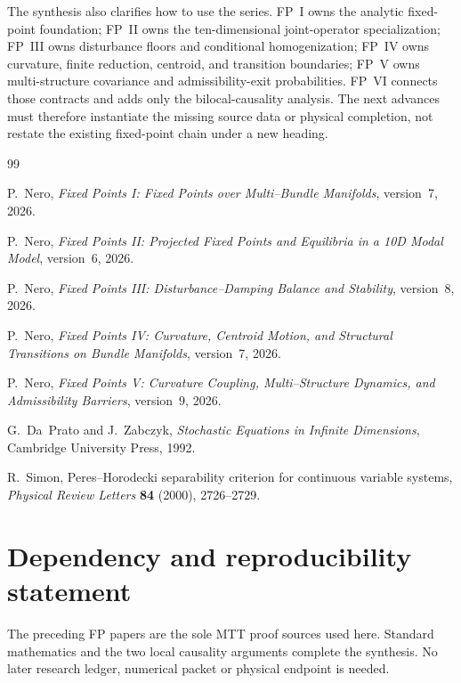 \documentclass[11pt]{article}
\begin{document}
The synthesis also clarifies how to use the series.  FP~I owns the analytic
fixed-point foundation; FP~II owns the ten-dimensional joint-operator
specialization; FP~III owns disturbance floors and conditional
homogenization; FP~IV owns curvature, finite reduction, centroid, and
transition boundaries; FP~V owns multi-structure covariance and
admissibility-exit probabilities. FP~VI connects those contracts and adds
only the bilocal-causality analysis.
The next advances must therefore instantiate the missing source data or
physical completion, not restate the existing fixed-point chain under a new
heading.

\begin{thebibliography}{99}

P.~Nero,
\newblock \emph{Fixed Points I: Fixed Points over Multi--Bundle Manifolds},
\newblock version~7, 2026.

P.~Nero,
\newblock \emph{Fixed Points II: Projected Fixed Points and Equilibria in a
10D Modal Model},
\newblock version~6, 2026.

P.~Nero,
\newblock \emph{Fixed Points III: Disturbance--Damping Balance and Stability},
\newblock version~8, 2026.

P.~Nero,
\newblock \emph{Fixed Points IV: Curvature, Centroid Motion, and Structural
Transitions on Bundle Manifolds},
\newblock version~7, 2026.

P.~Nero,
\newblock \emph{Fixed Points V: Curvature Coupling, Multi--Structure Dynamics,
and Admissibility Barriers},
\newblock version~9, 2026.

G.~Da~Prato and J.~Zabczyk,
\newblock \emph{Stochastic Equations in Infinite Dimensions},
\newblock Cambridge University Press, 1992.

R.~Simon,
\newblock Peres--Horodecki separability criterion for continuous variable
systems,
\newblock \emph{Physical Review Letters} \textbf{84} (2000), 2726--2729.

\end{thebibliography}

\section*{Dependency and reproducibility statement}
The preceding FP papers are the sole MTT proof sources used here. Standard
mathematics and the two local causality arguments complete the synthesis.
No later research ledger, numerical packet or physical endpoint is needed.
\end{document}
